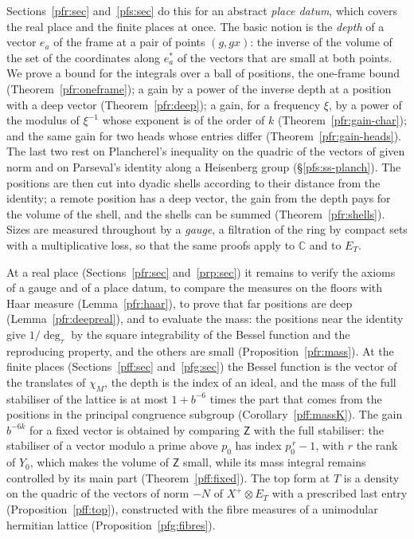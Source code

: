 \documentclass[10pt]{amsart}
\theoremstyle{definition}
\theoremstyle{remark}
\newcommand{\C}{\mathbb C}
\begin{document}
Sections~\ref{pfr:sec} and~\ref{pfs:sec} do this for an abstract \emph{place datum}, which
covers the real place and the finite places at once. The basic notion is the \emph{depth} of a
vector $e_a$ of the frame at a pair of points $(g,gx)$: the inverse of the volume of the set of
the coordinates along $e_a^*$ of the vectors that are small at both points. We prove a bound for
the integrals over a ball of positions, the one-frame bound (Theorem~\ref{pfr:oneframe}); a gain
by a power of the inverse depth at a position with a deep vector (Theorem~\ref{pfr:deep}); a
gain, for a frequency $\xi$, by a power of the modulus of $\xi^{-1}$ whose exponent is of the
order of $k$ (Theorem~\ref{pfr:gain-char}); and the same gain for two heads whose entries differ
(Theorem~\ref{pfr:gain-heads}). The last two rest on Plancherel's
inequality on the quadric of the vectors of given norm and on Parseval's identity along a
Heisenberg group (\S\ref{pfs:ss-planch}). The positions are then cut into dyadic shells
according to their distance from the identity; a remote position has a deep vector, the gain
from the depth pays for the volume of the shell, and the shells can be summed
(Theorem~\ref{pfr:shells}). Sizes are measured throughout by a \emph{gauge}, a filtration of the
ring by compact sets with a multiplicative loss, so that the same proofs apply to $\C$ and to
$E_T$.

At a real place (Sections~\ref{pfr:sec} and~\ref{prp:sec}) it remains to verify the axioms of a
gauge and of a place datum, to compare the measures on the floors with Haar measure
(Lemma~\ref{pfr:haar}), to prove that far positions are deep (Lemma~\ref{pfr:deepreal}), and to
evaluate the mass: the positions near the identity give $1/\deg_\tau$ by the square
integrability of the Bessel function and the reproducing property, and the others are small
(Proposition~\ref{pfr:mass}). At the finite places (Sections~\ref{pff:sec} and~\ref{pfg:sec}) the
Bessel function is the vector of the translates of $\chi_M$, the depth is the index of an ideal,
and the mass of the full stabiliser of the lattice is at most $1+b^{-6}$ times the part that
comes from the positions in the principal congruence subgroup
(Corollary~\ref{pff:massK}). The gain $b^{-6k}$ for a fixed vector is obtained by comparing
$\mathsf Z$ with the full stabiliser: the stabiliser of a vector modulo a prime above $p_0$ has
index $p_0^{\,r}-1$, with $r$ the rank of $Y_0$, which makes the volume of $\mathsf Z$ small,
while its mass integral remains controlled by its main part (Theorem~\ref{pff:fixed}). The top
form at $T$ is a density on the quadric of the vectors of norm $-N$ of $X^+\otimes E_T$ with a
prescribed last entry (Proposition~\ref{pff:top}), constructed with the fibre measures of a
unimodular hermitian lattice (Proposition~\ref{pfg:fibres}).
\end{document}
